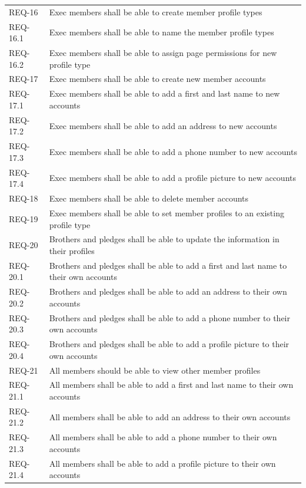 \documentclass{article}
\newcommand{\req}[1]{REQ-{#1}}
\begin{document}
\begin{tabular}{lp{8cm}}
\req{16} & Exec members shall be able to create member profile types\\
\req{16.1} & Exec members shall be able to name the member profile
types\\
\req{16.2} & Exec members shall be able to assign page permissions for
new profile type\\
\req{17} & Exec members shall be able to create new member accounts\\
\req{17.1} & Exec members shall be able to add a first and last name
to new accounts \\
\req{17.2} & Exec members shall be able to add an address to new
accounts \\
\req{17.3} & Exec members shall be able to add a phone number to new
accounts \\
\req{17.4} & Exec members shall be able to add a profile picture to
new accounts \\
\req{18} & Exec members shall be able to delete member accounts\\
\req{19} & Exec members shall be able to set member profiles to an existing profile type \\
\req{20} & Brothers and pledges shall be able to update the
information in their profiles \\
\req{20.1} & Brothers and pledges shall be able to add a first and last name
to their own accounts \\
\req{20.2} & Brothers and pledges shall be able to add an address to their own
accounts \\
\req{20.3} & Brothers and pledges shall be able to add a phone number to their own
accounts \\
\req{20.4} & Brothers and pledges shall be able to add a profile picture to
their own accounts \\
\req{21} & All members should be able to view other member profiles \\
\req{21.1} & All members shall be able to add a first and last name
to their own accounts \\
\req{21.2} & All members shall be able to add an address to their own
accounts \\
\req{21.3} & All members shall be able to add a phone number to their own
accounts \\
\req{21.4} & All members shall be able to add a profile picture to
their own accounts \\
\end{tabular}
\end{document}
